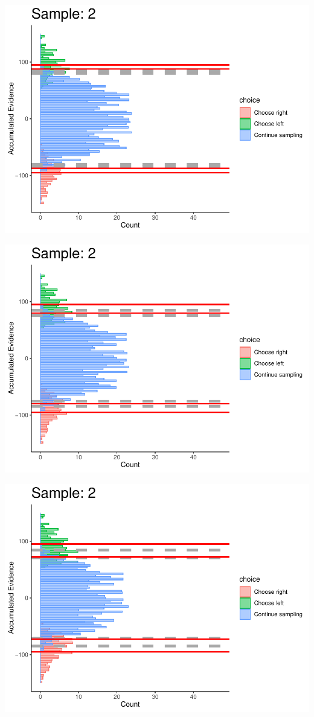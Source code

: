 \documentclass[
]{book}
\begin{document}
\begin{center}\includegraphics[width=0.8\linewidth]{LateNightBayes_files/figure-latex/collapsing_dcb-17} \end{center}

\begin{center}\includegraphics[width=0.8\linewidth]{LateNightBayes_files/figure-latex/collapsing_dcb-18} \end{center}

\begin{center}\includegraphics[width=0.8\linewidth]{LateNightBayes_files/figure-latex/collapsing_dcb-19} \end{center}
\end{document}
